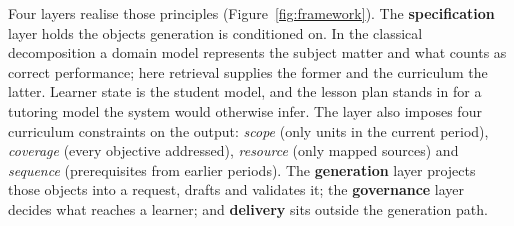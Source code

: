 \documentclass{article}
\begin{document}
Four layers realise those principles (Figure~\ref{fig:framework}). The \textbf{specification}
layer holds the objects generation is conditioned on. In the classical decomposition
\citep{wenger1987,nwana1990} a domain model represents the subject matter and what counts as
correct performance; here retrieval supplies the former and the curriculum the latter. Learner
state is the student model, and the lesson plan stands in for a tutoring model the system would
otherwise infer. The layer also imposes four
curriculum constraints on the output: \emph{scope} (only units in the current period), \emph{coverage} (every objective
addressed), \emph{resource} (only mapped sources) and \emph{sequence} (prerequisites from
earlier periods). The \textbf{generation} layer projects those objects into a request, drafts and
validates it; the \textbf{governance} layer decides what reaches a learner; and
\textbf{delivery} sits outside the generation path.
\end{document}
